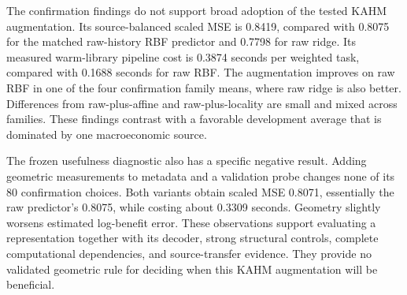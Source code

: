 The confirmation findings do not support broad adoption of the tested KAHM
augmentation. Its source-balanced scaled MSE is 0.8419, compared with
0.8075 for the matched raw-history RBF predictor and 0.7798 for raw ridge.
Its measured warm-library pipeline cost is 0.3874 seconds per weighted task,
compared with 0.1688 seconds for raw RBF. The augmentation improves on raw
RBF in one of the four confirmation family means, where raw ridge is also
better. Differences from raw-plus-affine and raw-plus-locality are small
and mixed across families. These findings contrast with a favorable
development average that is dominated by one macroeconomic source.

The frozen usefulness diagnostic also has a specific negative result.
Adding geometric measurements to metadata and a validation probe changes
none of its 80 confirmation choices. Both variants obtain scaled MSE
0.8071, essentially the raw predictor's 0.8075, while costing about
0.3309 seconds. Geometry slightly worsens estimated log-benefit error.
These observations support evaluating a representation together with its
decoder, strong structural controls, complete computational dependencies,
and source-transfer evidence. They provide no validated geometric rule
for deciding when this KAHM augmentation will be beneficial.
